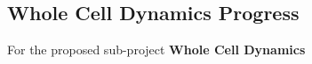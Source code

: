 
\subsection{Whole Cell Dynamics Progress}
For the proposed sub-project \textbf{Whole Cell Dynamics}
